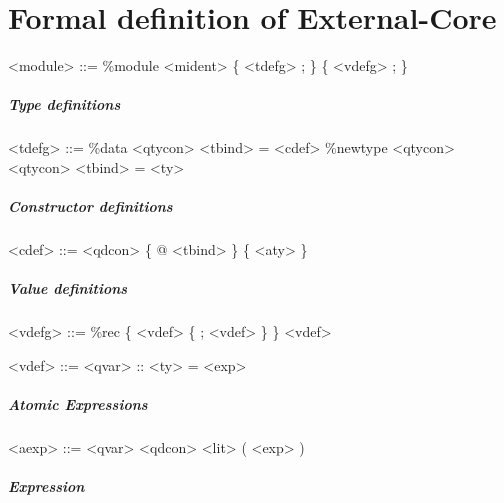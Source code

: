 
\chapter{Formal definition of External-Core}
\label{coregrammar}

\begin{grammar}
<module> ::= \%module <mident> \{ <tdefg> ; \} \{ <vdefg> ; \}
\end{grammar}

\paragraph{Type definitions}

\begin{grammar}
<tdefg> ::= \%data <qtycon> <tbind> = <cdef>
       \alt \%newtype <qtycon> <qtycon> <tbind> = <ty>
\end{grammar}

\paragraph{Constructor definitions}

\begin{grammar}
<cdef> ::= <qdcon> \{ @ <tbind> \} \{ <aty> \}
\end{grammar}

\paragraph{Value definitions}

\begin{grammar}
<vdefg> ::= \%rec \{ <vdef> \{ ; <vdef> \} \}
       \alt <vdef>
\end{grammar}

\begin{grammar}
<vdef> ::= <qvar> :: <ty> = <exp>
\end{grammar}

\paragraph{Atomic Expressions}

\begin{grammar}
<aexp> ::= <qvar>
      \alt <qdcon>
      \alt <lit>
      \alt ( <exp> )
\end{grammar}

\paragraph{Expression}

